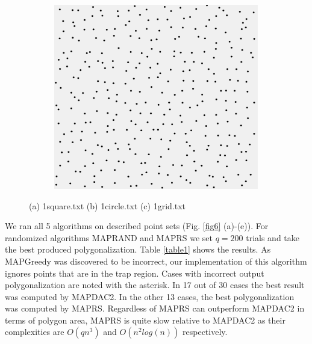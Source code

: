 \documentclass[conference]{IEEEtran}
\begin{document}
\begin{figure}[htbp]
\begin{subfigure}{0.32\linewidth}
				\caption{}
				\label{fig5b}
			\end{subfigure}
			\begin{subfigure}{0.32\linewidth}
				\centering
				\includegraphics[width=0.99\textwidth]{fig5c.png}
				\caption{}
				\label{fig5c}
			\end{subfigure}
			\caption
			{
				(a) 1{\textunderscore}square.txt
				(b) 1{\textunderscore}circle.txt
				(c) 1{\textunderscore}grid.txt
			}
			\label{fig5}
		\end{figure}
	
		We ran all 5 algorithms on described point sets (Fig. \ref{fig6} (a)-(e)).
		For randomized algorithms MAP{\textunderscore}RAND and MAP{\textunderscore}RS we set $q=200$ trials and take the best produced polygonalization.
		Table \ref{table1} shows the results.
		As MAP{\textunderscore}Greedy was discovered to be incorrect, our implementation of this algorithm ignores points that are in the trap region.
		Cases with incorrect output polygonalization are noted with the asterisk.
		In 17 out of 30 cases the best result was computed by MAP{\textunderscore}DAC2.
		In the other 13 cases, the best polygonalization was computed by MAP{\textunderscore}RS.
		Regardless of MAP{\textunderscore}RS can outperform MAP{\textunderscore}DAC2 in terms of polygon area, MAP{\textunderscore}RS is quite slow relative to MAP{\textunderscore}DAC2 as their complexities are $O(q n^{3})$ and $O(n^{2}log(n))$ respectively.
		
\end{document}
